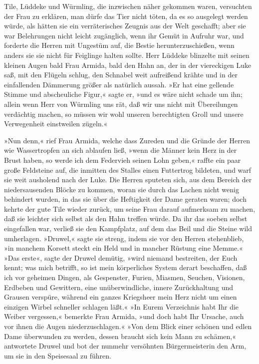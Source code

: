 Tile, Lüddeke und Würmling, die inzwischen näher gekommen waren,
versuchten der Frau zu erklären, man dürfe das Tier nicht töten, da
es so ausgelegt werden würde, als hätten sie ein verräterisches
Zeugnis aus der Welt geschafft; aber sie war Belehrungen nicht
leicht zugänglich, wenn ihr Gemüt in Aufruhr war, und forderte die
Herren mit Ungestüm auf, die Bestie herunterzuschießen, wenn anders
sie sie nicht für Feiglinge halten sollte. Herr Lüddeke blinzelte
mit seinen kleinen Augen bald Frau Armida, bald den Hahn an, der in
der viereckigen Luke saß, mit den Flügeln schlug, den Schnabel weit
aufreißend krähte und in der einfallenden Dämmerung größer als
natürlich aussah. »Er hat eine gellende Stimme und abscheuliche
Figur,« sagte er, »und es wäre nicht schade um ihn; allein wenn
Herr von Würmling uns rät, daß wir uns nicht mit\pagenum{[18]}
Übereilungen verdächtig machen, so müssen wir wohl unseren
berechtigten Groll und unsere Verwegenheit einstweilen zügeln.«

»Nun denn,« rief Frau Armida, welche dass Zureden und die Gründe
der Herren wie Wassertropfen an sich ablaufen ließ, »wenn die
Männer kein Herz in der Brust haben, so werde ich dem Federvieh
seinen Lohn geben,« raffte ein paar große Feldsteine auf, die
inmitten des Stalles einen Futtertrog bildeten, und warf sie weit
ausholend nach der Luke. Die Herren sputeten sich, aus dem Bereich
der niedersausenden Blöcke zu kommen, woran sie durch das Lachen
nicht wenig behindert wurden, in das sie über die Heftigkeit der
Dame geraten waren; doch kehrte der gute Tile wieder zurück, um
seine Frau darauf aufmerksam zu machen, daß sie leichter sich
selbst als den Hahn treffen würde. Da ihr das soeben selbst
eingefallen war, verließ sie den Kampfplatz, auf dem das Beil und
die Steine wild umherlagen. »Druwel,« sagte sie streng, indem sie
vor den Herren stehenblieb, »in manchem Korsett steckt ein Held und
in mancher Rüstung eine Memme.« »Das erste«, sagte der Druwel
demütig, »wird niemand bestreiten, der Euch kennt; was mich
betrifft, so ist mein körperliches System derart beschaffen, daß
ich vor geheimen Dingen, als Gespenster, Furien, Miasmen, Seuchen,
Visionen, Erdbeben und Gewittern, eine unüberwindliche, innere
Zurückhaltung und Grausen verspüre, während ein ganzes Kriegsheer
mein Herz nicht um einen einzigen Wirbel schneller schlagen läßt.«
»In Eurem Verzeichnis habt Ihr die Weiber vergessen,« bemerkte Frau
Armida, »und doch habt Ihr Ursache, auch vor ihnen die Augen
niederzuschlagen.« »Von dem Blick einer schönen und edlen Dame
überwunden zu werden,\pagenum{[19]} dessen braucht sich kein Mann
zu schämen,« antwortete Druwel und bot der nunmehr versöhnten
Bürgermeisterin den Arm, um sie in den Speisesaal zu führen.

